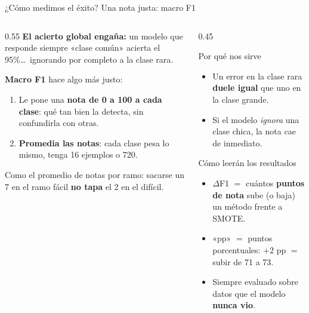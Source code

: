\begin{frame}{¿Cómo medimos el éxito? Una nota justa: macro F1}
\begin{columns}[T]

\begin{column}{0.55\textwidth}
\small
\textbf{El acierto global engaña:} un modelo que responde siempre «clase común» acierta el 95\%\dots\ ignorando por completo a la clase rara.

\vspace{0.5em}
\textbf{Macro F1} hace algo más justo:
\begin{enumerate}\setlength\itemsep{3pt}
  \item Le pone una \textbf{nota de 0 a 100 a cada clase}: qué tan bien la detecta, sin confundirla con otras.
  \item \textbf{Promedia las notas}: cada clase pesa lo mismo, tenga 16 ejemplos o 720.
\end{enumerate}

\vspace{0.5em}
\begin{insight}
\scriptsize
Como el promedio de notas por ramo: sacarse un 7 en el ramo fácil \textbf{no tapa} el 2 en el difícil.
\end{insight}
\end{column}

\begin{column}{0.45\textwidth}
\begin{block}{\small Por qué nos sirve}
\scriptsize
\begin{itemize}\setlength\itemsep{1pt}
  \item Un error en la clase rara \textbf{duele igual} que uno en la clase grande.
  \item Si el modelo \emph{ignora} una clase chica, la nota cae de inmediato.
\end{itemize}
\end{block}

\vspace{0.4em}
\begin{block}{\small Cómo leerán los resultados}
\scriptsize
\begin{itemize}\setlength\itemsep{1pt}
  \item $\Delta$F1 $=$ cuántos \textbf{puntos de nota} sube (o baja) un método frente a SMOTE.
  \item «pp» $=$ puntos porcentuales: $+2$ pp $=$ subir de 71 a 73.
  \item Siempre evaluado sobre datos que el modelo \textbf{nunca vio}.
\end{itemize}
\end{block}
\end{column}

\end{columns}

\end{frame}

